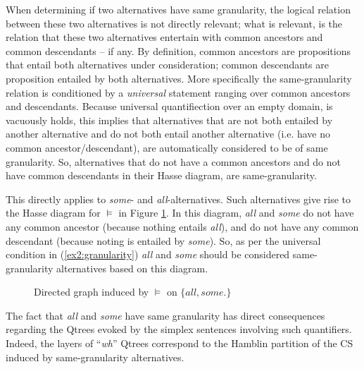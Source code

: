 When determining if two alternatives have same granularity, the logical relation between these two alternatives is not directly relevant; what is relevant, is the relation that these two alternatives entertain with common ancestors and common descendants -- if any. By definition, common ancestors are propositions that entail both alternatives under consideration; common descendants are proposition entailed by both alternatives. More specifically the same-granularity relation is conditioned by a \textit{universal} statement ranging over common ancestors and descendants. Because universal quantifiection over an empty domain, is vacuously holds, this implies that alternatives that are not both entailed by another alternative and do not both entail another alternative (i.e. have no common ancestor/descendant), are automatically considered to be of same granularity. So, alternatives that do not have a common ancestors and do not have common descendants in their Hasse diagram, are same-granularity.

This directly applies to \textit{some}- and \textit{all}-alternatives. Such alternatives give rise to the Hasse diagram for $\vDash$ in Figure \ref{fig7:entailment-graph-scalar1}. In this diagram, \textit{all} and \textit{some} do not have any common ancestor (because nothing entails \textit{all}), and do not have any common descendant (because noting is entailed by \textit{some}). So, as per the universal condition in (\ref{ex2:granularity}) \textit{all} and \textit{some} should be considered same-granularity alternatives based on this diagram.

\begin{figure}[H]
	\centering
	\caption[]{Directed graph induced by $\vDash$ on $\lbrace \textit{all}, \textit{some}.\rbrace$}\label{fig7:entailment-graph-scalar1}
\end{figure}


The fact that \textit{all} and \textit{some} have same granularity has direct consequences regarding the Qtrees evoked by the simplex sentences involving such quantifiers. Indeed, the layers of ``\textit{wh}'' Qtrees correspond to the Hamblin partition of the CS induced by same-granularity alternatives.

